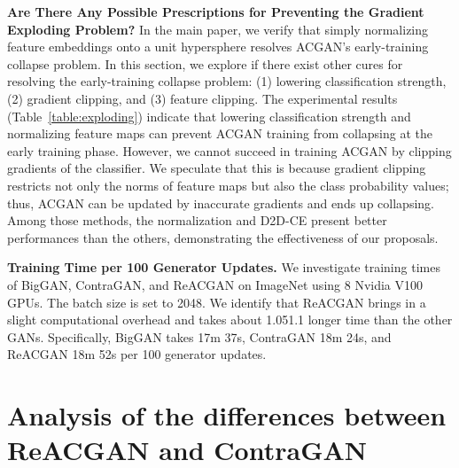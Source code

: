 \documentclass{article}
\begin{document}
\textbf{Are There Any Possible Prescriptions for Preventing the Gradient Exploding Problem?} In the main paper, we verify that simply normalizing feature embeddings onto a unit hypersphere resolves ACGAN's early-training collapse problem. In this section, we explore if there exist other cures for resolving the early-training collapse problem: (1) lowering classification strength, (2) gradient clipping, and (3) feature clipping. The experimental results (Table~\ref{table:exploding}) indicate that lowering classification strength and normalizing feature maps can prevent ACGAN training from collapsing at the early training phase. However, we cannot succeed in training ACGAN by clipping gradients of the classifier. We speculate that this is because gradient clipping restricts not only the norms of feature maps but also the class probability values; thus, ACGAN can be updated by inaccurate gradients and ends up collapsing. Among those methods, the normalization and D2D-CE present better performances than the others, demonstrating the effectiveness of our proposals.
\begin{table}[h!]
\centering
\caption{Experiments for studying available cures for preventing the gradient exploding problem in ACGAN. FID~\cite{Heusel2017GANsTB} scores are reported for evaluation.  is a balance coefficient between adversarial learning and classifier training.}
\vspace{2mm}
\label{table:exploding}
\vspace{-2.5mm}
\end{table} 
\textbf{Training Time per 100 Generator Updates.} We investigate training times of BigGAN, ContraGAN, and ReACGAN on ImageNet using 8 Nvidia V100 GPUs. The batch size is set to 2048. We identify that ReACGAN brings in a slight computational overhead and takes about 1.051.1 longer time than the other GANs. Specifically, BigGAN takes 17m 37s, ContraGAN 18m 24s, and ReACGAN 18m 52s per 100 generator updates. \section{Analysis of the differences between ReACGAN and ContraGAN}
\end{document}
